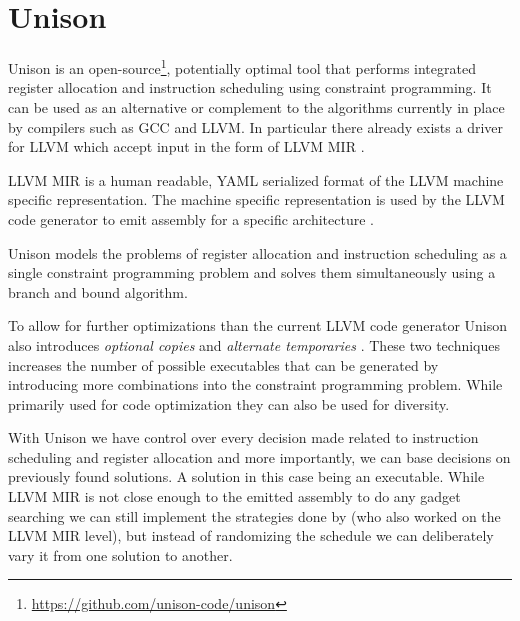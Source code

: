 \section{Unison}
\label{sec:unison}

Unison is an open-source\footnote{\url{https://github.com/unison-code/unison}},
potentially optimal tool that performs integrated register allocation and instruction
scheduling using constraint programming. It can be used as an alternative or complement to
the algorithms currently in place by compilers such as GCC and LLVM. In particular there
already exists a driver for LLVM which accept input in the form of LLVM MIR \cite{unison-docs}.

LLVM MIR is a human readable, YAML serialized format of the LLVM machine specific
representation\cite{llvm-mir-lang-ref}. The machine specific representation is used by the
LLVM code generator to emit assembly for a specific architecture \cite{welcome-to-backend}.

Unison models the problems of register allocation and instruction scheduling as a single
constraint programming problem and solves them simultaneously using a branch and bound
algorithm\cite{unison-docs,reg-alloc-inst-sched-uni,unison-src}.

To allow for further optimizations than the current LLVM code generator Unison also
introduces \textit{optional copies} and \textit{alternate temporaries}
\cite{reg-alloc-inst-sched-uni}. These two techniques increases the number of possible executables
that can be generated by introducing more combinations into the constraint programming
problem. While primarily used for code optimization they can also be used for diversity.

With Unison we have control over every decision made related to instruction scheduling and
register allocation and more importantly, we can base decisions on previously found solutions.
A solution in this case being an executable. While LLVM MIR is not close enough to the
emitted assembly to do any gadget searching we can still implement the strategies done by
\textcite{large-scale-automated} (who also worked on the LLVM MIR level), but instead of
randomizing the schedule we can deliberately vary it from one solution to another.
